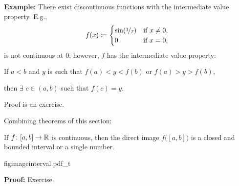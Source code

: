 \documentclass[10pt,aspectratio=149]{beamer}
\begin{document}
\begin{frame}

\textbf{Example:}
There exist discontinuous functions with
the intermediate value property.
\pause
E.g.,
\begin{equation*}
f(x) \coloneqq
\begin{cases}
\sin(\nicefrac{1}{x}) & \text{if } x \not= 0, \\
0 & \text{if } x=0,
\end{cases}
\end{equation*}
is not continuous at $0$; however, $f$ has the intermediate value property:

\pause
\medskip

If $a < b$ and $y$ is such that $f(a) < y < f(b)$ or $f(a) > y > f(b)$,

then $\exists$ $c \in (a,b)$ such that $f(c) = y$.

\pause
\medskip

Proof is an exercise.
\end{frame}

\begin{frame}

Combining theorems of this section:

\begin{corollary}
If $f \colon [a,b] \to {\mathbb{R}}$ is continuous, then the direct image
$f\bigl([a,b]\bigr)$
is a closed and bounded interval or a single number.
\end{corollary}

\pause
\begin{center}
{figimageinterval.pdf_t}
\end{center}

\pause
\textbf{Proof:} Exercise.

\end{frame}
\end{document}
